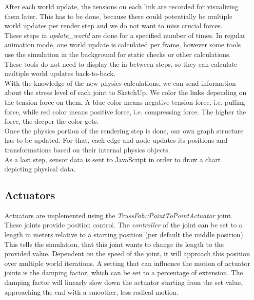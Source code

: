 After each world update, the tensions on each link are recorded for visualizing them later. This has to be done, because there could potentially be multiple world updates per render step and we do not want to miss crucial forces.\\
These steps in \textit{update\_world} are done for a specified number of times. In regular animation mode, one world update is calculated per frame, however some tools use the simulation in the background for static checks or other calculations. These tools do not need to display the in-between steps, so they can calculate multiple world updates back-to-back.\\
With the knowledge of the new physics calculations, we can send information about the stress level of each joint to SketchUp. We color the links depending on the tension force on them. A blue color means negative tension force, i.e. pulling force, while red color means positive force, i.e. compressing force. The higher the force, the deeper the color gets.\\
Once the physics portion of the rendering step is done, our own graph structure has to be updated. For that, each edge and node updates its positions and transformations based on their internal physics objects.\\
As a last step, sensor data is sent to JavaScript in order to draw a chart depicting physical data.

\subsection{Actuators}
Actuators are implemented using the \textit{TrussFab::PointToPointActuator} joint. These joints provide position control. The \textit{controller} of the joint can be set to a length in meters relative to a starting position (per default the middle position). This tells the simulation, that this joint wants to change its length to the provided value. Dependent on the speed of the joint, it will approach this position over multiple world iterations. A setting that can influence the motion of actuator joints is the damping factor, which can be set to a percentage of extension. The damping factor will linearly slow down the actuator starting from the set value, approaching the end with a smoother, less radical motion.

